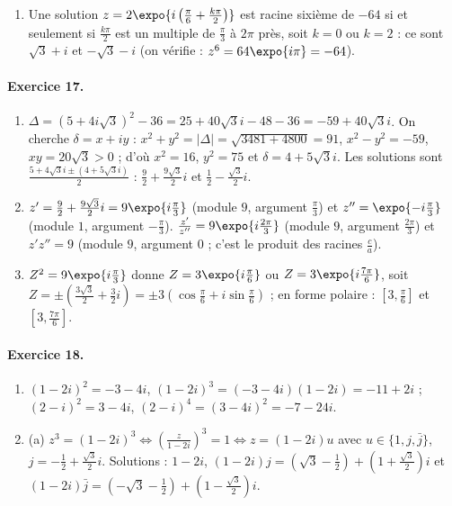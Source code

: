 \begin{corrige}
\begin{enumerate}
      (b) $-8 + 8\sqrt{3}i = 16\expo{i\frac{2\pi}{3}}$ : $z = 2\expo{i\left(\frac{\pi}{6} + \frac{k\pi}{2}\right)}$, $0 \leq k \leq 3$, soit
      $S = \{\sqrt{3} + i ; -1 + \sqrt{3}i ; -\sqrt{3} - i ; 1 - \sqrt{3}i\}$.
\item Une solution $z = 2\expo{i\left(\frac{\pi}{6} + \frac{k\pi}{2}\right)}$ est racine sixi\`eme de $-64$ si et seulement si $\frac{k\pi}{2}$ est un multiple de $\frac{\pi}{3}$ \`a $2\pi$ pr\`es,
      soit $k = 0$ ou $k = 2$ : ce sont $\sqrt{3} + i$ et $-\sqrt{3} - i$ (on v\'erifie : $z^6 = 64\expo{i\pi} = -64$).
\end{enumerate}

\paragraph{Exercice 17.}
\begin{enumerate}
\item $\Delta = (5 + 4i\sqrt{3})^2 - 36 = 25 + 40\sqrt{3}i - 48 - 36 = -59 + 40\sqrt{3}i$.
      On cherche $\delta = x + iy$ : $x^2 + y^2 = |\Delta| = \sqrt{3481 + 4800} = 91$, $x^2 - y^2 = -59$, $xy = 20\sqrt{3} > 0$ ;
      d'o\`u $x^2 = 16$, $y^2 = 75$ et $\delta = 4 + 5\sqrt{3}i$.
      Les solutions sont $\frac{5 + 4\sqrt{3}i \pm (4 + 5\sqrt{3}i)}{2}$ : $\boxed{\frac{9}{2} + \frac{9\sqrt{3}}{2}i}$ et $\boxed{\frac{1}{2} - \frac{\sqrt{3}}{2}i}$.
\item $z' = \frac{9}{2} + \frac{9\sqrt{3}}{2}i = 9\expo{i\frac{\pi}{3}}$ (module $9$, argument $\frac{\pi}{3}$) et
      $z'' = \expo{-i\frac{\pi}{3}}$ (module $1$, argument $-\frac{\pi}{3}$).
      $\frac{z'}{z''} = 9\expo{i\frac{2\pi}{3}}$ (module $9$, argument $\frac{2\pi}{3}$) et $z'z'' = 9$ (module $9$, argument $0$ ; c'est le produit des racines $\frac{c}{a}$).
\item $Z^2 = 9\expo{i\frac{\pi}{3}}$ donne $Z = 3\expo{i\frac{\pi}{6}}$ ou $Z = 3\expo{i\frac{7\pi}{6}}$, soit
      $Z = \pm\left(\frac{3\sqrt{3}}{2} + \frac{3}{2}i\right) = \pm 3\left(\cos\frac{\pi}{6} + i\sin\frac{\pi}{6}\right)$ ;
      en forme polaire : $\left[3, \frac{\pi}{6}\right]$ et $\left[3, \frac{7\pi}{6}\right]$.
\end{enumerate}

\paragraph{Exercice 18.}
\begin{enumerate}
\item $(1-2i)^2 = -3 - 4i$, $(1-2i)^3 = (-3-4i)(1-2i) = \boxed{-11 + 2i}$ ;
      $(2-i)^2 = 3 - 4i$, $(2-i)^4 = (3-4i)^2 = \boxed{-7 - 24i}$.
\item (a) $z^3 = (1-2i)^3 \iff \left(\frac{z}{1-2i}\right)^3 = 1 \iff z = (1-2i)u$ avec $u \in \{1, j, \bar{j}\}$, $j = -\frac{1}{2} + \frac{\sqrt{3}}{2}i$.
      Solutions : $1 - 2i$, $(1-2i)j = \left(\sqrt{3} - \frac{1}{2}\right) + \left(1 + \frac{\sqrt{3}}{2}\right)i$ et
      $(1-2i)\bar{j} = \left(-\sqrt{3} - \frac{1}{2}\right) + \left(1 - \frac{\sqrt{3}}{2}\right)i$.


\end{enumerate}
\end{corrige}
